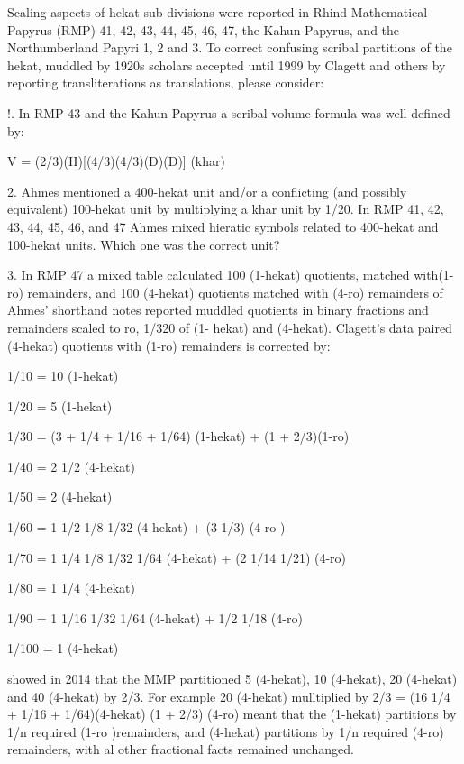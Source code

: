 \documentclass[12pt]{article}
\begin{document}
Scaling aspects of hekat sub-divisions were reported in Rhind Mathematical Papyrus (RMP) 41, 42, 43, 44, 45, 46, 47, the Kahun Papyrus, and the Northumberland Papyri 1, 2 and 3.  To correct confusing scribal partitions of the hekat, muddled by 1920s scholars accepted until 1999 by Clagett and others by reporting transliterations as translations, please consider:

!. In  RMP 43 and the Kahun Papyrus a scribal volume formula was well defined by:

V = (2/3)(H)[(4/3)(4/3)(D)(D)] (khar) 

2. Ahmes mentioned a 400-hekat unit and/or a conflicting (and possibly equivalent) 100-hekat unit by multiplying a khar unit by 1/20. In RMP 41, 42, 43, 44, 45, 46, and 47 Ahmes mixed hieratic symbols related to 400-hekat and 100-hekat units. Which one was the correct unit?

3. In RMP 47 a mixed  table calculated 100 (1-hekat) quotients, matched with(1-ro) remainders, and 100 (4-hekat) quotients matched with (4-ro) remainders  of Ahmes' shorthand notes reported muddled quotients in binary fractions and remainders scaled to ro, 1/320 of (1- hekat) and (4-hekat). Clagett's data paired (4-hekat) quotients with (1-ro) remainders is corrected by:

1/10 = 10 (1-hekat)

1/20 = 5 (1-hekat) 

1/30 = (3 + 1/4 + 1/16 + 1/64) (1-hekat) + (1 + 2/3)(1-ro)

1/40 = 2 1/2 (4-hekat)

1/50 = 2 (4-hekat)

1/60 = 1 1/2 1/8 1/32 (4-hekat) +  (3 1/3) (4-ro )

1/70 = 1 1/4 1/8 1/32 1/64 (4-hekat) +  (2 1/14 1/21) (4-ro) 

1/80 = 1 1/4 (4-hekat)
  
1/90 = 1 1/16 1/32 1/64 (4-hekat) +  1/2 1/18 (4-ro) 

1/100 = 1 (4-hekat) 

 showed in 2014 that the MMP partitioned 5 (4-hekat), 10 (4-hekat), 20 (4-hekat) and 40 (4-hekat) by 2/3. For example 20 (4-hekat) mulltiplied by 2/3 = (16 1/4 + 1/16 + 1/64)(4-hekat) (1 + 2/3) (4-ro) meant that the (1-hekat) partitions by 1/n required (1-ro )remainders, and (4-hekat) partitions by 1/n required (4-ro) remainders, with al other fractional facts remained unchanged.
\end{document}
